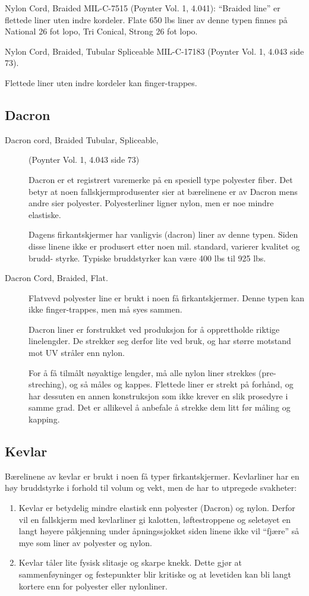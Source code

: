 Nylon Cord, Braided MIL-C-7515 (Poynter Vol. 1, 4.041): ``Braided line'' er flettede liner uten indre kordeler. Flate 650 lbs liner av denne typen finnes på National 26 fot lopo, Tri Conical, Strong 26 fot lopo.

Nylon Cord, Braided, Tubular Spliceable MIL-C-17183 (Poynter Vol. 1, 4.043 side 73).

Flettede liner uten indre kordeler kan finger-trappes.

\subsection{Dacron}
\begin{description}
	\item[Dacron cord, Braided Tubular, Spliceable,] (Poynter Vol. 1, 4.043 side 73)

	Dacron er et registrert varemerke på en spesiell type polyester fiber. Det betyr at noen fallskjermprodusenter sier at bærelinene er av Dacron mens andre sier polyester. Polyesterliner ligner nylon, men er noe mindre elastiske.

	Dagens firkantskjermer har vanligvis (dacron) liner av denne typen. Siden disse linene ikke er produsert etter noen mil. standard, varierer kvalitet og brudd- styrke. Typiske bruddstyrker kan være 400 lbs til 925 lbs.

	\item[Dacron Cord, Braided, Flat.] Flatvevd polyester line er brukt i noen få firkantskjermer. Denne typen kan ikke finger-trappes, men må syes sammen.

	Dacron liner er forstrukket ved produksjon for å opprettholde riktige linelengder. De strekker seg derfor lite ved bruk, og har større motstand mot UV stråler enn nylon.

	For å få tilmålt nøyaktige lengder, må alle nylon liner strekkes (pre-streching), og så måles og kappes. Flettede liner er strekt på forhånd, og har dessuten en annen konstruksjon som ikke krever en slik prosedyre i samme grad. Det er allikevel å anbefale å strekke dem litt før måling og kapping.
\end{description}

\subsection{Kevlar}
Bærelinene av kevlar er brukt i noen få typer firkantskjermer. Kevlarliner har en høy bruddstyrke i forhold til volum og vekt, men de har to utpregede svakheter:
\begin{enumerate}
	\item Kevlar er betydelig mindre elastisk enn polyester (Dacron) og nylon. Derfor vil en fallskjerm med kevlarliner gi kalotten, løftestroppene og seletøyet en langt høyere påkjenning under åpningssjokket siden linene ikke vil ``fjære'' så mye som liner av polyester og nylon.
	\item Kevlar tåler lite fysisk slitasje og skarpe knekk. Dette gjør at sammenføyninger og festepunkter blir kritiske og at levetiden kan bli langt kortere enn for polyester eller nylonliner.
\end{enumerate}

